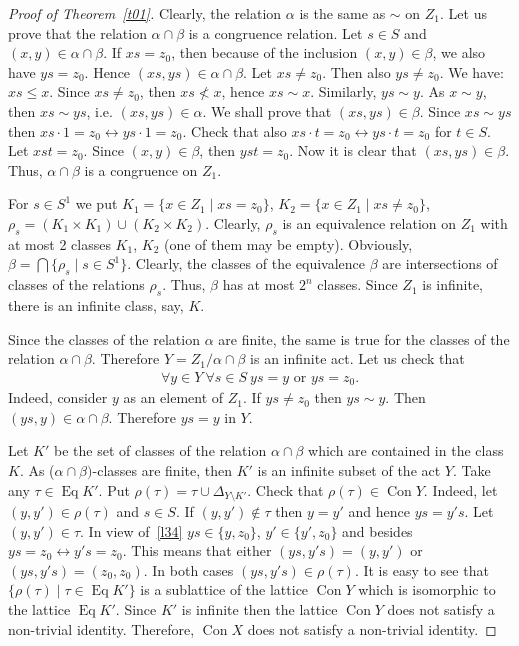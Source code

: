 \documentclass{birkau}
\numberwithin{equation}{section}
\theoremstyle{plain}
\theoremstyle{definition}
\DeclareMathOperator{\Con}{Con}
\DeclareMathOperator{\Eq}{Eq}
\begin{document}
\begin{proof}[Proof of Theorem~\ref{t01}]
		Clearly, the relation $\alpha$ is the same as $\sim$ on $Z_1$. Let us prove that the relation $\alpha \cap \beta$ is a congruence relation. Let $s \in S$ and $(x,y) \in \alpha \cap \beta$. If $xs = z_0$, then because of the inclusion $(x,y) \in \beta$, we also have $ys = z_0$. Hence $(xs,ys) \in \alpha \cap \beta$. Let $xs \neq z_0$. Then also $ ys \neq z_0 $. We have: $xs \leqslant x$. Since $xs \neq z_0$, then $xs \not < x$, hence $xs \sim x$. Similarly, $ys \sim y$. As $x \sim y$, then $ xs \sim ys$, i.e. $(xs,ys) \in \alpha$. We shall prove that $(xs,ys) \in \beta$. Since $xs \sim ys$ then $xs \cdot 1 = z_0 \leftrightarrow ys \cdot 1 = z_0$. Check that also $xs \cdot t = z_0 \leftrightarrow ys \cdot t = z_0$ for $t \in S$. Let $xst = z_0$. Since $(x,y) \in \beta$, then $yst = z_0$. Now it is clear that $(xs,ys) \in \beta$. Thus, $\alpha \cap \beta$ is a congruence on $Z_1$.
		
		For $s \in S^1$ we put $ K_1 = \{ x \in Z_1 \mid xs = z_0 \} $, $ K_2 = \{ x \in Z_1 \mid xs \neq z_0 \}$, $\rho_s = (K_1 \times K_1) \cup (K_2 \times K_2)$. Clearly, $\rho_s$ is an equivalence relation on $Z_1$ with at most 2 classes $K_1$, $K_2$ (one of them may be empty). Obviously, $\beta = \bigcap \{\rho_s \mid s \in S^1\}$. Clearly, the classes of the equivalence $\beta$ are intersections of classes of the relations $\rho_s$. Thus, $\beta$ has at most $2^{n}$ classes. Since $Z_1$ is infinite, there is an infinite class, say, $K$.
		
		Since the classes of the relation $\alpha$ are finite, the same is true for the classes of the relation $\alpha \cap \beta$. Therefore $Y = {Z_1}/{\alpha \cap \beta}$ is an infinite act. Let us check that
		\begin{gather}
		    \forall y \in Y \ \forall s \in S \ ys = y \text{ or } ys = z_0. \label{l34}
		\end{gather}
		Indeed, consider $y$ as an element of $Z_1$. If $ys \neq z_0$ then $ys \sim y$. Then $(ys,y) \in \alpha \cap \beta$. Therefore $ys = y$ in $Y$.
		
		Let $K'$ be the set of classes of the relation $\alpha \cap \beta$ which are contained in the class $K$. As ($\alpha \cap \beta)$-classes are finite, then $K'$ is an infinite subset of the act $Y$. Take any $\tau \in \Eq K'$. Put $\rho(\tau) = \tau \cup \Delta_{Y \setminus K'}$. Check that $\rho(\tau) \in \Con Y$. Indeed, let $(y,y') \in \rho(\tau)$ and $s \in S$. If $(y,y') \notin \tau$ then $y = y'$ and hence $ys = y's$. Let $(y,y') \in \tau$. In view of~\eqref{l34} $ys \in \{y,z_0\}$, $y' \in \{ y',z_0 \}$ and besides $ys = z_0 \leftrightarrow y's = z_0$. This means that either $(ys,y's) = (y,y')$ or $(ys,y's) = (z_0,z_0)$. In both cases $(ys,y's) \in \rho(\tau)$. It is easy to see that $\{\rho(\tau) \mid \tau \in \Eq K' \} $ is a sublattice of the lattice $\Con Y$ which is isomorphic to the lattice $\Eq K'$. Since $K'$ is infinite then the lattice $\Con Y$ does not satisfy a non-trivial identity. Therefore, $\Con X$ does not satisfy a non-trivial identity.
		

\end{proof}
\end{document}

